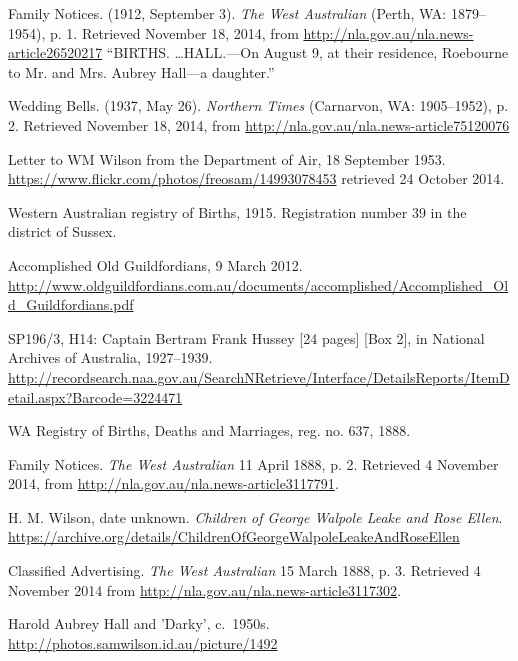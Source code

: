 \begin{thebibliography}{99}

	Family Notices. (1912, September 3). \emph{The West Australian} (Perth, WA: 1879--1954), p. 1.
	Retrieved November 18, 2014, from \url{http://nla.gov.au/nla.news-article26520217}
	``BIRTHS. \dots HALL.---On August 9, at their residence, Roebourne to Mr. and Mrs. Aubrey Hall---a daughter.''

	Wedding Bells. (1937, May 26). \emph{Northern Times} (Carnarvon, WA: 1905--1952), p. 2.
	Retrieved November 18, 2014, from \url{http://nla.gov.au/nla.news-article75120076}

	Letter to WM Wilson from the Department of Air, 18 September 1953.
	\url{https://www.flickr.com/photos/freosam/14993078453} retrieved 24 October 2014.

	Western Australian registry of Births, 1915. Registration number 39 in the district of Sussex.

	Accomplished Old Guildfordians, 9 March 2012.
	\url{http://www.oldguildfordians.com.au/documents/accomplished/Accomplished_Old_Guildfordians.pdf}

	SP196/3, H14: Captain Bertram Frank Hussey [24 pages] [Box 2], in National Archives of Australia, 1927--1939.
    \url{http://recordsearch.naa.gov.au/SearchNRetrieve/Interface/DetailsReports/ItemDetail.aspx?Barcode=3224471}

	WA Registry of Births, Deaths and Marriages, reg. no. 637, 1888.

	Family Notices. \emph{The West Australian} 11 April 1888, p. 2. Retrieved 4 November 2014,
	from \url{http://nla.gov.au/nla.news-article3117791}.

	H. M. Wilson, date unknown. \emph{Children of George Walpole Leake and Rose Ellen}.
	\url{https://archive.org/details/ChildrenOfGeorgeWalpoleLeakeAndRoseEllen}

	Classified Advertising. \emph{The West Australian} 15 March 1888, p. 3.
	Retrieved 4 November 2014 from \url{http://nla.gov.au/nla.news-article3117302}.

	Harold Aubrey Hall and 'Darky', c.\ 1950s.
	\url{http://photos.samwilson.id.au/picture/1492}


\end{thebibliography}
